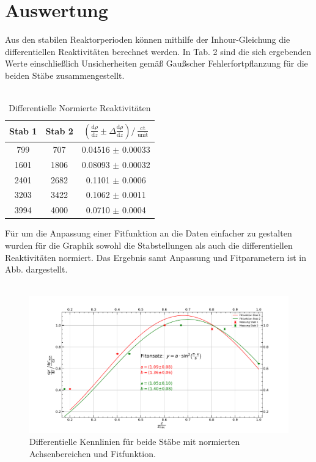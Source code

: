 \documentclass[german,  %
parskip=full,  %
]{scrartcl}
\begin{document}
\section{Auswertung}
Aus den stabilen Reaktorperioden können mithilfe der Inhour-Gleichung die differentiellen Reaktivitäten berechnet werden. In Tab. 2 sind die sich ergebenden Werte einschließlich Unsicherheiten gemäß Gaußscher Fehlerfortpflanzung für die beiden Stäbe zusammengestellt. \\\\
\begin{table}[h!]\centering
\begin{tabular}{|c|c|c|}
\hline
Stab 1 & Stab 2 & \((\frac{\mathrm{d}\rho}{\mathrm{d}z} \pm \Delta\frac{\mathrm{d}\rho}{\mathrm{d}z})/\,\frac{\mathrm{ct}}{\mathrm{unit}}\) \\\hline
799 & 707 & 0.04516 \(\pm\) 0.00033 \\\hline
1601 & 1806 & 0.08093 \(\pm\) 0.00032 \\\hline
2401 & 2682 & 0.1101 \(\pm\) 0.0006 \\\hline
3203 & 3422 & 0.1062 \(\pm\) 0.0011 \\\hline
3994 & 4000 & 0.0710 \(\pm\) 0.0004 \\\hline
\end{tabular}
\caption{Differentielle Normierte Reaktivitäten}
\end{table} 
Für um die Anpassung einer Fitfunktion an die Daten einfacher zu gestalten wurden für die Graphik sowohl die Stabstellungen als auch die differentiellen Reaktivitäten normiert. Das Ergebnis samt Anpassung und Fitparametern ist in Abb. dargestellt. \\\\
\begin{figure}[h!]\centering
\includegraphics[width=\textwidth]{differentielle_Kennlinie.pdf}
\caption{Differentielle Kennlinien für beide Stäbe mit normierten Achsenbereichen und Fitfunktion.}
\end{figure}
\end{document}
